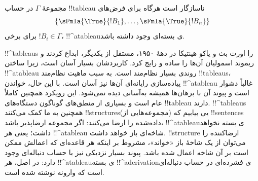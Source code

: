 \documentclass[../../../include/open-logic-section]{subfiles}
\begin{document}
مجموعهٔ $\Gamma$ در حساب !!{tableau} ناسازگار است هرگاه برای فرض‌های
\[
\{\sFmla{\True}{!B_1}, \dots, \sFmla{\True}{!B_n}\}
\]
برای برخی $!B_i \in \Gamma$، !!^a{tableau}ی بسته‌ای وجود داشته باشد.

!!^{tableau}s را اورت بث و یاکو هینتیکا در دههٔ ۱۹۵۰، مستقل از یکدیگر،
ابداع کردند و ریموند اسمولیان آن‌ها را ساده و رایج کرد. کاربردشان بسیار
آسان است، زیرا ساختن !!^a{tableau} روندی بسیار نظام‌مند است. به سبب ماهیت
نظام‌مند !!{tableau}s، پیاده‌سازی رایانه‌ای آن‌ها نیز آسان است. با این حال،
خواندن !!^a{tableau} غالباً دشوار است و پیوند آن با برهان‌ها همیشه به‌آسانی
دیده نمی‌شود. این رویکرد همچنین کاملاً عام است و بسیاری از منطق‌های گوناگون
دستگاه‌های !!{tableau} دارند. !!^{tableau}s همچنین به ما کمک می‌کنند
!!{structure}sیی بیابیم که (مجموعه‌هایی از) !!{sentence}s داده‌شده را ارضا
می‌کنند: اگر مجموعه ارضاپذیر باشد، !!^a{tableau}ی بسته نخواهد داشت؛ یعنی هر
!!^a{tableau} شاخه‌ای باز خواهد داشت. !!{structure} ارضاکننده را می‌توان از
یک شاخهٔ باز «خواند»، مشروط بر اینکه هر قاعده‌ای که اعمالش ممکن است بر آن
شاخه اعمال شده باشد. پیوند بسیار نزدیکی نیز با حساب دنباله‌ای وجود دارد:
در اصل، هر !!^a{tableau}ی بسته !!^a{derivation}ی فشرده‌ای در حساب دنباله‌ای
است که وارونه نوشته شده است.
\end{document}
